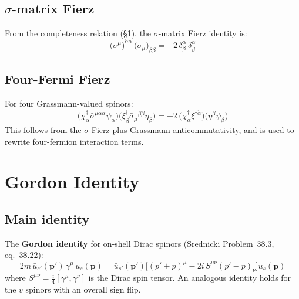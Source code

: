 
\subsection{$\sigma$-matrix Fierz}

From the completeness relation (§1), the $\sigma$-matrix Fierz identity is:
\begin{equation}
  \bigl(\bar\sigma^\mu\bigr)^{\dot\alpha\alpha}\,\bigl(\sigma_\mu\bigr)_{\beta\dot\beta}
  = -2\,\delta^\alpha_\beta\,\delta^{\dot\alpha}_{\dot\beta}
  \tag{38.18}
\end{equation}

\subsection{Four-Fermi Fierz}

For four Grassmann-valued spinors:
\begin{equation}
  \bigl(\chi^\dagger_{\dot\alpha}\bar\sigma^{\mu\dot\alpha\alpha}\psi_\alpha\bigr)
  \bigl(\xi^\dagger_{\dot\beta}\bar\sigma_\mu{}^{\dot\beta\beta}\eta_\beta\bigr)
  = -2\,\bigl(\chi^\dagger_{\dot\alpha}\xi^{\dagger\dot\alpha}\bigr)
         \bigl(\eta^\beta\psi_\beta\bigr)
  \tag{38.21}
\end{equation}
This follows from the $\sigma$-Fierz plus Grassmann anticommutativity,
and is used to rewrite four-fermion interaction terms.

\section{Gordon Identity}

\subsection{Main identity}

The \textbf{Gordon identity} for on-shell Dirac spinors
(Srednicki Problem~38.3, eq.~38.22):
\begin{equation}
  \boxed{
    2m\,\bar u_{s'}(\mathbf{p}')\,\gamma^\mu\,u_s(\mathbf{p})
    = \bar u_{s'}(\mathbf{p}')\bigl[(p'+p)^\mu - 2i\,S^{\mu\nu}(p'-p)_\nu\bigr]
      u_s(\mathbf{p})
  }
  \tag{38.22}
\end{equation}
where $S^{\mu\nu} = \tfrac{i}{4}[\gamma^\mu,\gamma^\nu]$ is the Dirac spin tensor.
An analogous identity holds for the $v$ spinors with an overall sign flip.

